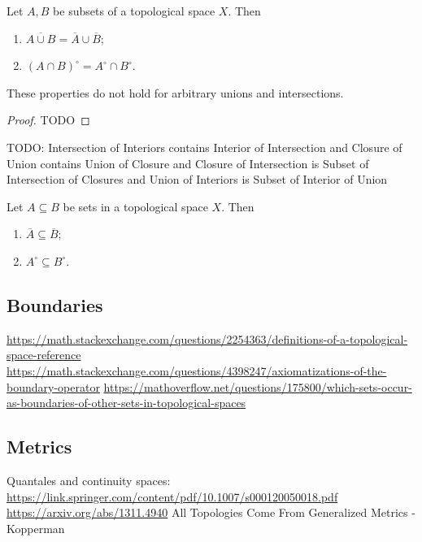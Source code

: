 \begin{lemma}
Let $A,B$ be subsets of a topological space $X$. Then
\begin{enumerate}
\item $\overline{A\cup B} = \overline{A}\cup \overline{B}$;
\item $(A\cap B)^\circ = A^\circ \cap B^\circ$.
\end{enumerate}
These properties do not hold for arbitrary unions and intersections.
\end{lemma}
\begin{proof}
TODO
\end{proof}
\begin{lemma}
TODO: Intersection of Interiors contains Interior of Intersection and Closure of Union contains Union of Closure and Closure of Intersection is Subset of Intersection of Closures and Union of Interiors is Subset of Interior of Union
\end{lemma}

\begin{lemma} \label{closureInteriorSubsets}
Let $A\subseteq B$ be sets in a topological space $X$. Then
\begin{enumerate}
\item $\overline{A} \subseteq \overline{B}$;
\item $A^\circ \subseteq B^\circ$.
\end{enumerate}
\end{lemma}

\subsection{Boundaries}
\url{https://math.stackexchange.com/questions/2254363/definitions-of-a-topological-space-reference}
\url{https://math.stackexchange.com/questions/4398247/axiomatizations-of-the-boundary-operator}
\url{https://mathoverflow.net/questions/175800/which-sets-occur-as-boundaries-of-other-sets-in-topological-spaces}

\subsection{Metrics}
Quantales and continuity spaces: \url{https://link.springer.com/content/pdf/10.1007/s000120050018.pdf}
\url{https://arxiv.org/abs/1311.4940}
All Topologies Come From Generalized Metrics - Kopperman

